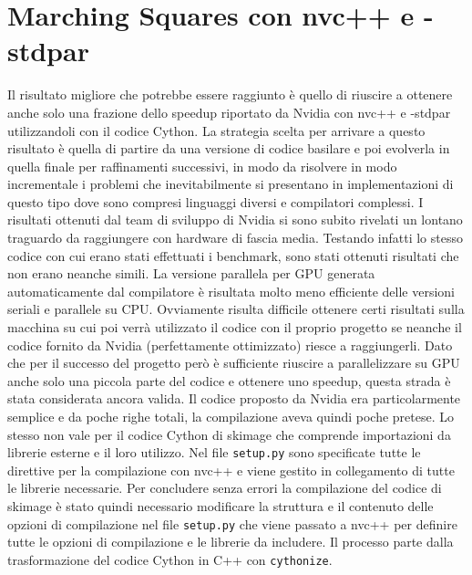 \documentclass[12pt,a4paper]{report}
\begin{document}
\section{Marching Squares con nvc++ e -stdpar}
Il risultato migliore che potrebbe essere raggiunto è quello di riuscire a ottenere anche solo una frazione dello speedup riportato da Nvidia con nvc++ e -stdpar utilizzandoli con il codice Cython.\newline
La strategia scelta per arrivare a questo risultato è quella di partire da una versione di codice basilare e poi evolverla in quella finale per raffinamenti successivi, in modo da risolvere in modo incrementale i problemi che inevitabilmente si presentano in implementazioni di questo tipo dove sono compresi linguaggi diversi e compilatori complessi. \newline 
I risultati ottenuti dal team di sviluppo di Nvidia si sono subito rivelati un lontano traguardo da raggiungere con hardware di fascia media. 
Testando infatti lo stesso codice con cui erano stati effettuati i benchmark, sono stati ottenuti risultati che non erano neanche simili. 
La versione parallela per GPU generata automaticamente dal compilatore è risultata molto meno efficiente delle versioni seriali e parallele su CPU. Ovviamente risulta difficile ottenere certi risultati sulla macchina su cui poi verrà utilizzato il codice con il proprio progetto se neanche il codice fornito da Nvidia (perfettamente ottimizzato) riesce a raggiungerli. Dato che per il successo del progetto però è sufficiente riuscire a parallelizzare su GPU anche solo una piccola parte del codice e ottenere uno speedup, questa strada è stata considerata ancora valida. \newline
Il codice proposto da Nvidia era particolarmente semplice e da poche righe totali, la compilazione aveva quindi poche pretese. Lo stesso non vale per il codice Cython di skimage che comprende importazioni da librerie esterne e il loro utilizzo. Nel file \verb|setup.py| sono specificate tutte le direttive per la compilazione con nvc++ e viene gestito in collegamento di tutte le librerie necessarie. Per concludere senza errori la compilazione del codice di skimage è stato quindi necessario modificare la struttura e il contenuto delle opzioni di compilazione nel file \verb|setup.py| che viene passato a nvc++ per definire tutte le opzioni di compilazione e le librerie da includere. \newline
Il processo parte dalla trasformazione del codice Cython in C++ con \verb|cythonize|. \\[10pt]
\end{document}

